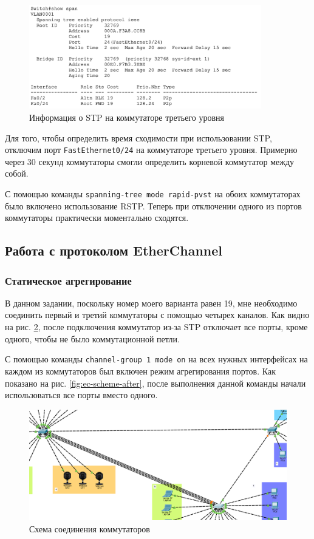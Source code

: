 \documentclass[a4paper, 14pt]{extarticle}
\begin{document}
\begin{figure}[H]
  \centering
  \includegraphics[width=0.9\textwidth]{images/rstp/root.png}
  \caption{Информация о STP на коммутаторе третьего уровня}
  \label{fig:rstp-root}
\end{figure}

Для того, чтобы определить время сходимости при использовании STP, отключим порт
\texttt{FastEthernet0/24} на коммутаторе третьего уровня. Примерно через 30
секунд коммутаторы смогли определить корневой коммутатор между собой.

С помощью команды \texttt{spanning-tree mode rapid-pvst} на обоих коммутаторах
было включено использование RSTP. Теперь при отключении одного из портов
коммутаторы практически моментально сходятся.

\subsection{Работа с протоколом EtherChannel}

\subsubsection{Статическое агрегирование}

В данном задании, поскольку номер моего варианта равен 19, мне необходимо
соединить первый и третий коммутаторы с помощью четырех каналов. Как видно на
рис. \ref{fig:ec-scheme-before}, после подключения коммутатор из-за STP
отключает все порты, кроме одного, чтобы не было коммутационной петли.

С помощью команды \texttt{channel-group 1 mode on} на всех нужных
интерфейсах на каждом из коммутаторов был включен режим агрегирования портов.
Как показано на рис. \ref{fig:ec-scheme-after}, после выполнения данной команды
начали использоваться все порты вместо одного.

\begin{figure}[H]
  \centering
  \includegraphics[width=\textwidth]{images/ec/scheme-before.png}
  \caption{Схема соединения коммутаторов}
  \label{fig:ec-scheme-before}
\end{figure}
\end{document}
